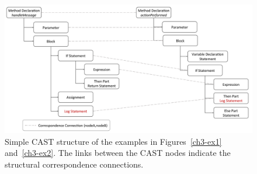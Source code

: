 \begin{figure}
\centering\includegraphics [width = \textwidth, height=0.5\textheight]{Drawing4/FinalCorr.pdf}
\caption[Simple CAST structure of the examples in Figures~\ref{ch3-ex1} and~\ref{ch3-ex2}.]{Simple CAST structure of the examples in Figures~\ref{ch3-ex1} and~\ref{ch3-ex2}. The links between the CAST nodes indicate the structural correspondence connections.\label{fig:meth-ast-1}}
\end{figure}


